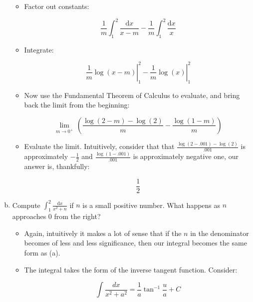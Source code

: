 \documentclass[11pt]{article}
\begin{document}
\begin{enumerate}[a)]
\begin{itemize}
	\item Factor out constants:
	
	\begin{equation*}
	\frac{1}{m} \int_1^2 \frac{\mathrm{d}x}{x - m} - \frac{1}{m}\int_1^2 \frac{\mathrm{d}x}{x}
	\end{equation*}
	
	\item Integrate:
	
	\begin{equation*}
	\left.\frac{1}{m} \log(x - m)\right|_1^2 - \left.\frac{1}{m}\log(x)\right|_1^2
	\end{equation*}
	
	\item Now use the Fundamental Theorem of Calculus to evaluate, and bring back the limit from the beginning:
	
	\begin{equation*}
	\lim_{m\to 0^+} \, \left(\frac{\log (2-m)-\log (2)}{m}- \frac{\log (1-m)}{m}\right)
	\end{equation*}
	
	\item Evaluate the limit. Intuitively, consider that that $\frac{\log(2 - .001) - \log(2)}{.001}$ is approximately $-\frac{1}{2}$ and $\frac{\log(1 - .001)}{.001}$ is approximately negative one, our answer is, thankfully:
	
	\begin{equation*}
	\frac{1}{2}
	\end{equation*}
	
	\end{itemize}

\item Compute $\int_1^2 \! \frac{\mathrm{d}x}{x^2 + n}$ if $n$ is a small positive number. What happens as $n$ approaches 0 from the right?

	\begin{itemize} 
	
	\item Again, intuitively it makes a lot of sense that if the $n$ in the denominator becomes of less and less significance, then our integral becomes the same form as (a).
	
	\item The integral takes the form of the inverse tangent function. Consider:
	
	\begin{equation*}
	\int \frac{dx}{x^2 + a^2} = \frac{1}{a}\tan^{-1}\frac{u}{a} + C
	\end{equation*}
	

\end{itemize}
\end{enumerate}
\end{document}
